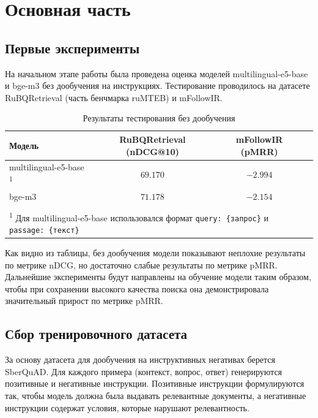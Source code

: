 \documentclass[12pt, a4paper, oneside]{article}
\begin{document}
\newpage

\section{Основная часть}
\label{sec:main}

\subsection{Первые эксперименты}

На начальном этапе работы была проведена оценка моделей multilingual-e5-base и bge-m3 без дообучения на инструкциях. Тестирование проводилось на датасете RuBQRetrieval (часть бенчмарка ruMTEB) и mFollowIR.

\begin{table}[H]
    \centering
    \caption{Результаты тестирования без дообучения}
    \label{tab:instruction_results}
    \begin{tabular}{lccc}
        \toprule
        \textbf{Модель} & \textbf{RuBQRetrieval (nDCG@10)} & \textbf{mFollowIR (pMRR)} \\
        \midrule
        multilingual-e5-base \textsuperscript{1} & $69.170$ & $-2.994$ \\
        bge-m3 & $71.178$ & $-2.154$ \\
        \bottomrule
        \\
        \multicolumn{3}{l}{\footnotesize \textsuperscript{1} Для multilingual-e5-base использовался формат \texttt{query: \{запрос\}} и \texttt{passage: \{текст\}}}
    \end{tabular}
    \vspace{0.2cm}
\end{table}

Как видно из таблицы, без дообучения модели показывают неплохие результаты по метрике nDCG, но достаточно слабые результаты по метрике pMRR. Дальнейшие эксперименты будут направлены на обучение модели таким образом, чтобы при сохранении высокого качества поиска она демонстрировала значительный прирост по метрике pMRR. 

\subsection{Сбор тренировочного датасета}

За основу датасета для дообучения на инструктивных негативах берется 
SberQuAD. Для каждого примера (контекст, вопрос, ответ) генерируются позитивные и негативные инструкции. 
Позитивные инструкции формулируются так, чтобы модель должна была выдавать релевантные документы, 
а негативные инструкции содержат условия, которые нарушают релевантность. 
\end{document}
